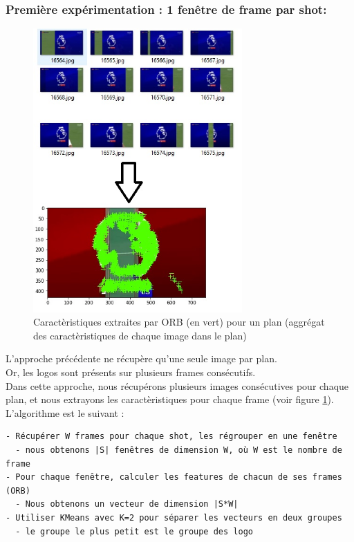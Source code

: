 \documentclass[11pt]{article}
\begin{document}
\subsubsection{Première expérimentation : 1 fenêtre de frame par shot:}
\label{sec:org50a7bde}
\begin{figure}[htbp]
\centering
\includegraphics[width=8cm]{akaze_window_res.jpg}
\caption{Caractèristiques extraites par ORB (en vert) pour un plan (aggrégat des caractèristiques de chaque image dans le plan) \label{orb-window}}
\end{figure}
L'approche précédente ne récupère qu'une seule image par plan.\\
Or, les logos sont présents sur plusieurs frames consécutifs.\\
Dans cette approche, nous récupérons plusieurs images consécutives pour chaque plan, et nous extrayons les caractèristiques pour chaque frame (voir figure \ref{orb-window}).\\

L'algorithme est le suivant :\\
\begin{verbatim}
- Récupérer W frames pour chaque shot, les régrouper en une fenêtre
  - nous obtenons |S| fenêtres de dimension W, où W est le nombre de frame
- Pour chaque fenêtre, calculer les features de chacun de ses frames (ORB)
  - Nous obtenons un vecteur de dimension |S*W|
- Utiliser KMeans avec K=2 pour séparer les vecteurs en deux groupes
  - le groupe le plus petit est le groupe des logo
\end{verbatim}
\end{document}
